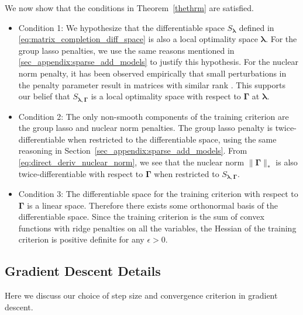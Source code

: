 \documentclass[12pt,letterpaper]{article}
\begin{document}
We now show that the conditions in Theorem~\ref{thethrm} are satisfied.
\begin{itemize}
	\item[] Condition 1: We hypothesize that the differentiable space $S_{\boldsymbol{\lambda}}$ defined in \eqref{eq:matrix_completion_diff_space} is also a local optimality space $\boldsymbol{\lambda}$. For the group lasso penalties, we use the same reasons mentioned in \ref{sec_appendix:sparse_add_models} to justify this hypothesis. For the nuclear norm penalty, it has been observed empirically that small perturbations in the penalty parameter result in matrices with similar rank \citep{mazumder2010spectral}. This supports our belief that $S_{\boldsymbol{\lambda}, \boldsymbol{\Gamma}}$ is a local optimality space with respect to $\boldsymbol{\Gamma}$ at $\boldsymbol{\lambda}$.
	\item[] Condition 2: The only non-smooth components of the training criterion are the group lasso and nuclear norm penalties. The group lasso penalty is twice-differentiable when restricted to the differentiable space, using the same reasoning in Section~\ref{sec_appendix:sparse_add_models}. From \eqref{eq:direct_deriv_nuclear_norm}, we see that the nuclear norm $\|\boldsymbol{\Gamma}\|_{*}$ is also twice-differentiable with respect to $\boldsymbol{\Gamma}$ when restricted to $S_{\boldsymbol{\lambda}, \boldsymbol{\Gamma}}$.

	\item[] Condition 3: The differentiable space for the training criterion with respect to $\boldsymbol{\Gamma}$ is a linear space. Therefore there exists some orthonormal basis of the differentiable space. Since the training criterion is the sum of convex functions with ridge penalties on all the variables, the Hessian of the training criterion is positive definite for any $\epsilon > 0$.
	
\end{itemize}

\subsection{Gradient Descent Details}\label{sec:alg_details}
Here we discuss our choice of step size and convergence criterion in gradient descent.
\end{document}

